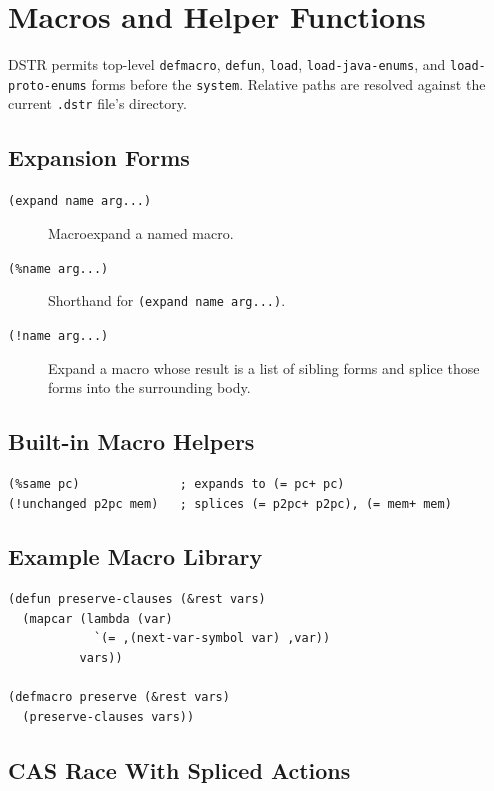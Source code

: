 \documentclass[11pt]{article}
\begin{document}
\section{Macros and Helper Functions}

DSTR permits top-level \texttt{defmacro}, \texttt{defun}, \texttt{load},
\texttt{load-java-enums}, and \texttt{load-proto-enums} forms before the
\texttt{system}.  Relative paths are resolved against the current
\texttt{.dstr} file's directory.

\subsection{Expansion Forms}

\begin{description}
\item[\texttt{(expand name arg...)}] Macroexpand a named macro.
\item[\texttt{(\%name arg...)}] Shorthand for \texttt{(expand name arg...)}.
\item[\texttt{(!name arg...)}] Expand a macro whose result is a list of sibling
  forms and splice those forms into the surrounding body.
\end{description}

\subsection{Built-in Macro Helpers}

\begin{lstlisting}[language=DSTR]
(%same pc)              ; expands to (= pc+ pc)
(!unchanged p2pc mem)   ; splices (= p2pc+ p2pc), (= mem+ mem)
\end{lstlisting}

\subsection{Example Macro Library}

\begin{lstlisting}[language=DSTR]
(defun preserve-clauses (&rest vars)
  (mapcar (lambda (var)
            `(= ,(next-var-symbol var) ,var))
          vars))

(defmacro preserve (&rest vars)
  (preserve-clauses vars))
\end{lstlisting}

\subsection{CAS Race With Spliced Actions}
\end{document}
